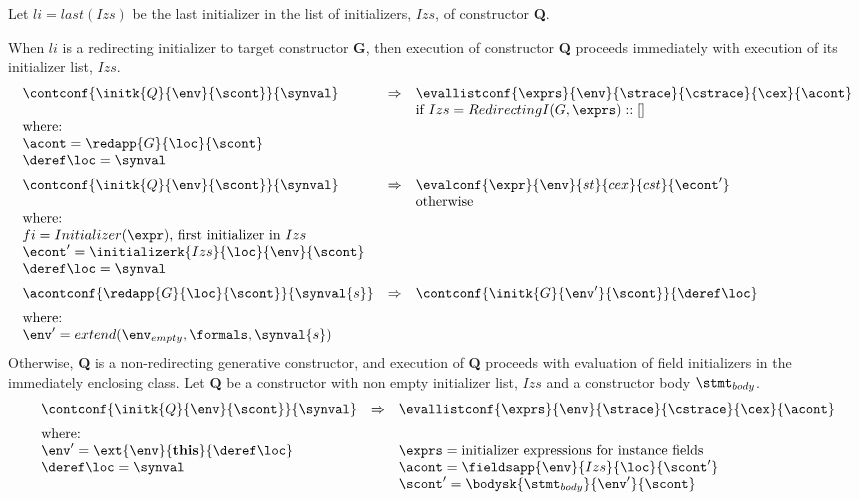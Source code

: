 \documentclass{article}
\begin{document}
\noindent
Let $li = last(Izs)$ be the last initializer in the list of initializers, $Izs$, of constructor \textbf{Q}.

\noindent
When $li$ is a redirecting initializer to target constructor \textbf{G}, then execution of constructor \textbf{Q} proceeds immediately with execution of its initializer list, $Izs$.
\[
  \begin{array}{lcl}
	\contconf{\initk{Q}{\env}{\scont}}{\synval}
	& \Rightarrow &
	\evallistconf{\exprs}{\env}{\strace}{\cstrace}{\cex}{\acont}\\	
	&&
	\textrm{if } Izs = RedirectingI(G, \exprs) :: []\\
	\textrm{where:}\\
	\acont = \redapp{G}{\loc}{\scont}\\
	\deref\loc = \synval
	\\[2mm]

	\contconf{\initk{Q}{\env}{\scont}}{\synval}
	& \Rightarrow &
	\evalconf{\expr}{\env}{st}{cex}{cst}{\econt'}\\
	&&
	\textrm{otherwise}\\
	\textrm{where:}\\

	fi = Initializer(\expr) \textrm{, first initializer in }Izs\\
	\econt' = \initializerk{Izs}{\loc}{\env}{\scont}\\
	\deref\loc = \synval\\[2mm]

	\acontconf{\redapp{G}{\loc}{\scont}}{\synval{s}}
	& \Rightarrow &
	\contconf{\initk{G}{\env'}{\scont}}{\deref\loc}\\[2mm]
	\textrm{where:}\\
	\env' = extend(\env_{empty}, \formals, \synval{s})
  \end{array}
\]
\noindent
Otherwise, \textbf{Q} is a non-redirecting generative constructor, and execution of \textbf{Q} proceeds with evaluation of field initializers in the immediately enclosing class.
\noindent
Let \textbf{Q} be a constructor with non empty initializer list, $Izs$ and a constructor body $\stmt_{body}$.
\[
  \begin{array}{lcl}
	\contconf{\initk{Q}{\env}{\scont}}{\synval}
	& \Rightarrow &
	\evallistconf{\exprs}{\env}{\strace}{\cstrace}{\cex}{\acont}\\[2mm]

	\textrm{where:}\\
	\env' = \ext{\env}{\mathbf{this}}{\deref\loc}
	&&
	\exprs = \textrm{initializer expressions for instance fields}\\
	\deref\loc = \synval
	&&
	\acont = \fieldsapp{\env}{Izs}{\loc}{\scont'}\\
	&&
	\scont' = \bodysk{\stmt_{body}}{\env'}{\scont}
  \end{array}
\]
\end{document}
